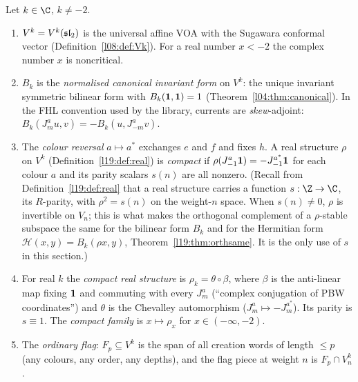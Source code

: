 \begin{definition}\label{l19:def:bcdata}
Let $k\in\C$, $k\ne-2$.
\begin{enumerate}
\item $V^k = V^k(\mathfrak{sl}_2)$ is the universal affine VOA with the Sugawara conformal vector
  (Definition~\ref{l08:def:Vk}). For a real number $x<-2$ the complex number $x$ is noncritical.
\item $B_k$ is the \emph{normalised canonical invariant form} on $V^k$: the unique invariant symmetric bilinear
  form with $B_k(\mathbf{1},\mathbf{1}) = 1$ (Theorem~\ref{l04:thm:canonical}). In the FHL convention
  used by the library, currents are \emph{skew}-adjoint: $B_k(J^a_mu,v) = -B_k(u,J^a_{-m}v)$.
\item The \emph{colour reversal} $a\mapsto a^*$ exchanges $e$ and $f$ and fixes $h$. A real structure $\rho$ on
  $V^k$ (Definition~\ref{l19:def:real}) is \emph{compact} if $\rho(J^a_{-1}\mathbf{1}) = -J^{a^*}_{-1}\mathbf{1}$
  for each colour $a$ and its parity scalars $s(n)$ are all nonzero. (Recall from Definition~\ref{l19:def:real} that a
  real structure carries a function $s:\Z\to\C$, its $R$-parity, with $\rho^2 = s(n)$ on the weight-$n$ space. When
  $s(n)\ne0$, $\rho$ is invertible on $V_n$; this is what makes the orthogonal complement of a $\rho$-stable subspace
  the same for the bilinear form $B_k$ and for the Hermitian form $\mathcal H(x,y) = B_k(\rho x,y)$,
  Theorem~\ref{l19:thm:orthsame}. It is the only use of $s$ in this section.)
\item For real $k$ the \emph{compact real structure} is $\rho_k = \theta\circ\beta$, where $\beta$ is the
  anti-linear map fixing $\mathbf{1}$ and commuting with every $J^a_m$ (``complex conjugation of PBW
  coordinates'') and $\theta$ is the Chevalley automorphism ($J^a_m\mapsto -J^{a^*}_m$). Its parity is $s\equiv1$.
  The \emph{compact family} is $x\mapsto\rho_x$ for $x\in(-\infty,-2)$.
\item The \emph{ordinary flag}: $F_p\subseteq V^k$ is the span of all creation words of length $\le p$ (any
  colours, any order, any depths), and the flag piece at weight $n$ is $F_p\cap V^k_n$.
\end{enumerate}
\end{definition}


